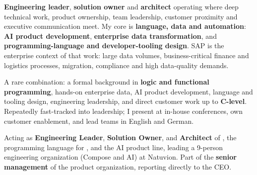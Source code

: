 \documentclass[noindent]{scrartcl}
\begin{document}
\newpage




%
\noindent \textbf{Engineering leader}, \textbf{solution owner} and \textbf{architect} operating where deep technical work, product ownership,
team leadership, customer proximity and executive communication meet. My core is \textbf{language, data and automation}:
\textbf{AI product development}, \textbf{enterprise data transformation}, and \textbf{programming-language and developer-tooling design}.
SAP is the enterprise context of that work: large data volumes, business-critical finance and logistics processes,
migration, compliance and high data-quality demands.

\vspace{0.5em}
\noindent A rare combination: a formal background in \textbf{logic and functional programming}, hands-on enterprise data,
AI product development, language and tooling design, engineering leadership, and direct customer work up to \textbf{C-level}.
Repeatedly fast-tracked into leadership; I present at in-house conferences, own customer enablement, and lead teams in
English and German.


\vspace{0.5em}

%
\noindent Acting as \textbf{Engineering Leader}, \textbf{Solution Owner}, and \textbf{Architect} of \compose, the programming language for \migrate, and the AI product line, leading a 9-person engineering organization (Compose and AI) at Natuvion. Part of the \textbf{senior management} of the product organization, reporting directly to the CEO.
\end{document}
